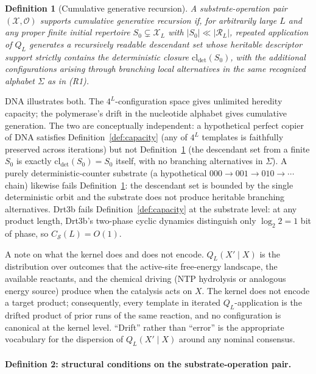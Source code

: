 \documentclass[aps,prx,reprint,amsmath,amssymb,floatfix,superscriptaddress,nofootinbib]{revtex4-2}
\theoremstyle{plain-thm}
\theoremstyle{definition-thm}
\newtheorem{definition}[theorem]{Definition}
\newcommand{\Csub}{C_{\mathcal{S}}}
\newcommand{\Xset}{\mathcal{X}}
\newcommand{\Op}{\mathcal{O}}
\newcommand{\Reach}{\mathcal{R}}
\begin{document}
\begin{definition}[Cumulative generative recursion]
\label{def:generation}
A substrate-operation pair $(\Xset, \Op)$ supports \textnormal{cumulative generative recursion} if, for arbitrarily large $L$ and any proper finite initial repertoire $S_0 \subsetneq \Xset_L$ with $|S_0| \ll |\Reach_L|$, repeated application of $Q_L$ generates a recursively readable descendant set whose heritable descriptor support strictly contains the deterministic closure $\mathrm{cl}_{\det}(S_0)$, with the additional configurations arising through branching local alternatives in the same recognized alphabet $\Sigma$ as in (R1).
\end{definition}

DNA illustrates both. The $4^L$-configuration space gives unlimited heredity capacity; the polymerase's drift in the nucleotide alphabet gives cumulative generation. The two are conceptually independent: a hypothetical perfect copier of DNA satisfies Definition~\ref{def:capacity} (any of $4^L$ templates is faithfully preserved across iterations) but not Definition~\ref{def:generation} (the descendant set from a finite $S_0$ is exactly $\mathrm{cl}_{\det}(S_0) = S_0$ itself, with no branching alternatives in $\Sigma$). A purely deterministic-counter substrate (a hypothetical $000 \to 001 \to 010 \to \cdots$ chain) likewise fails Definition~\ref{def:generation}: the descendant set is bounded by the single deterministic orbit and the substrate does not produce heritable branching alternatives. Drt3b fails Definition~\ref{def:capacity} at the substrate level: at any product length, Drt3b's two-phase cyclic dynamics distinguish only $\log_2 2 = 1$ bit of phase, so $\Csub(L) = O(1)$.

A note on what the kernel does and does not encode. $Q_L(X' \mid X)$ is the distribution over outcomes that the active-site free-energy landscape, the available reactants, and the chemical driving (NTP hydrolysis or analogous energy source) produce when the catalysis acts on $X$. The kernel does not encode a target product; consequently, every template in iterated $Q_L$-application is the drifted product of prior runs of the same reaction, and no configuration is canonical at the kernel level. ``Drift'' rather than ``error'' is the appropriate vocabulary for the dispersion of $Q_L(X' \mid X)$ around any nominal consensus.

\paragraph{Definition 2: structural conditions on the substrate-operation pair.}
\end{document}

